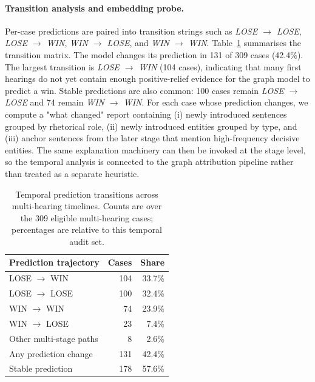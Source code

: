 \documentclass[runningheads]{llncs}
\begin{document}
\paragraph{Transition analysis and embedding probe.}
Per-case predictions are paired into transition strings such as \emph{LOSE $\rightarrow$ LOSE}, \emph{LOSE $\rightarrow$ WIN}, \emph{WIN $\rightarrow$ LOSE}, and \emph{WIN $\rightarrow$ WIN}. Table~\ref{tab:temporal-transitions} summarises the transition matrix. The model changes its prediction in 131 of 309 cases (42.4\%). The largest transition is \emph{LOSE $\rightarrow$ WIN} (104 cases), indicating that many first hearings do not yet contain enough positive-relief evidence for the graph model to predict a win. Stable predictions are also common: 100 cases remain \emph{LOSE $\rightarrow$ LOSE} and 74 remain \emph{WIN $\rightarrow$ WIN}. For each case whose prediction changes, we compute a "what changed" report containing (i) newly introduced sentences grouped by rhetorical role, (ii) newly introduced entities grouped by type, and (iii) anchor sentences from the later stage that mention high-frequency decisive entities. The same explanation machinery can then be invoked at the stage level, so the temporal analysis is connected to the graph attribution pipeline rather than treated as a separate heuristic.

\begin{table}[!htbp]
\centering
\caption{Temporal prediction transitions across multi-hearing timelines. Counts are over the 309 eligible multi-hearing cases; percentages are relative to this temporal audit set.}
\label{tab:temporal-transitions}
\setlength{\tabcolsep}{8pt}
\renewcommand{\arraystretch}{1.12}
\small
\begin{tabular}{lrr}
\toprule
Prediction trajectory & Cases & Share \\
\midrule
LOSE $\rightarrow$ WIN & 104 & 33.7\% \\
LOSE $\rightarrow$ LOSE & 100 & 32.4\% \\
WIN $\rightarrow$ WIN & 74 & 23.9\% \\
WIN $\rightarrow$ LOSE & 23 & 7.4\% \\
Other multi-stage paths & 8 & 2.6\% \\
\midrule
Any prediction change & 131 & 42.4\% \\
Stable prediction & 178 & 57.6\% \\
\bottomrule
\end{tabular}
\end{table}
\end{document}
